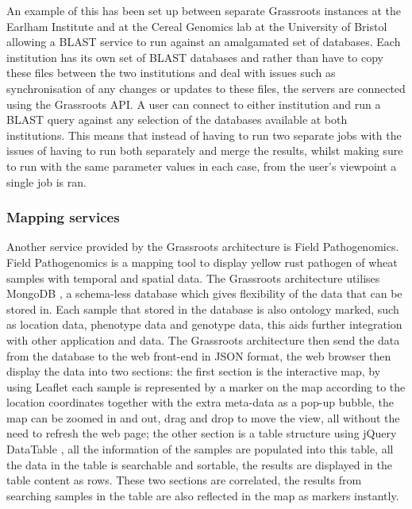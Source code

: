 \documentclass[9pt,a4paper]{extarticle}
\begin{document}
An example of this has been set up between separate Grassroots instances at the Earlham Institute and at the Cereal Genomics lab at the University of Bristol allowing a BLAST service to run against an amalgamated set of databases. 
Each institution has its own set of BLAST databases and rather than have to copy these files between the two institutions and deal with issues such as synchronisation of any changes or updates to these files, the servers are connected using the Grassroots API. A user can connect to either institution and run a BLAST query against any selection of the databases available at both institutions. 
This means that instead of having to run two separate jobs with the issues of having to run both separately and merge the results, whilst making sure to run with the same parameter values in each case, from the user's viewpoint a single job is ran.


\subsubsection*{Mapping services}

Another service provided by the Grassroots architecture is Field Pathogenomics. Field Pathogenomics is a mapping tool to display yellow rust pathogen of wheat samples with temporal and spatial data. The Grassroots architecture utilises MongoDB \cite{mongodb}, a schema-less database which gives flexibility of the data that can be stored in. Each sample that stored in the database is also ontology marked, such as location data, phenotype data and genotype data, this aids further integration with other application and data. The Grassroots architecture then send the data from the database to the web front-end in JSON format, the web browser then display the data into two sections: the first section is the interactive map, by using Leaflet \cite{leaflet} each sample is represented by a marker on the map according to the location coordinates together with the extra meta-data as a pop-up bubble, the map can be zoomed in and out, drag and drop to move the view, all without the need to refresh the web page; the other section is a table structure using jQuery \cite{jquery} DataTable \cite{datatable}, all the information of the samples are populated into this table, all the data in the table is searchable and sortable, the results are displayed in the table content as rows. These two sections are correlated, the results from searching samples in the table are also reflected in the map as markers instantly.
\end{document}
